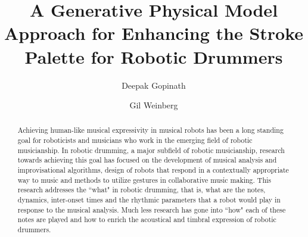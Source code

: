 \documentclass[final,1p,times]{elsarticle}
\begin{document}
\begin{frontmatter}


\title{A Generative Physical Model Approach for Enhancing the Stroke Palette for Robotic Drummers}

 \author[gt]{Deepak Gopinath}
 
 \author[gt]{Gil Weinberg}
 
  
%
   \address[gt]{Georgia Tech Center for Music Technology, Georgia Tech, Atlanta, GA, 30318, USA}

\begin{abstract}
	Achieving human-like musical expressivity in musical robots has been a long standing goal for roboticists and musicians who work in the emerging field of robotic musicianship. In robotic drumming, a major subfield of robotic musicianship, research towards achieving this goal has focused on the development of musical analysis and improvisational algorithms, design of robots that respond in a contextually appropriate way to music and methods to utilize gestures in collaborative music making. This research addresses the ``what" in robotic drumming, that is, what are the notes, dynamics, inter-onset times and the rhythmic parameters that a robot would play in response to the musical analysis. Much less research has gone into ``how" each of these notes are played and how to enrich the acoustical and timbral expression of robotic drummers.
	

\end{abstract}
\end{frontmatter}
\end{document}

